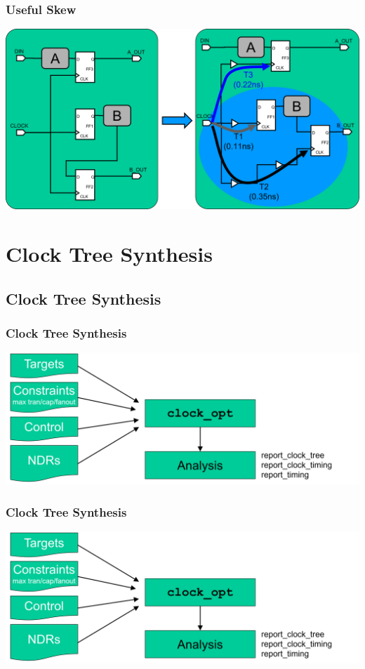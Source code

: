 \documentclass[compress]{beamer}
\begin{document}
\begin{frame}
	\frametitle{Useful Skew}
		\begin{center}
		\includegraphics[width=\textwidth]{Useful}
	\end{center}

\end{frame}
\section[CTS]{Clock Tree Synthesis}
\subsection[CTS]{Clock Tree Synthesis}
\begin{frame}
	\frametitle{Clock Tree Synthesis}
	\begin{center}
		\includegraphics[width=\textwidth]{CTS0}
	\end{center}
\end{frame}

\begin{frame}
	\frametitle{Clock Tree Synthesis}
	\begin{center}
		\includegraphics[width=\textwidth]{CTS0}
	\end{center}
\end{frame}
\end{document}
